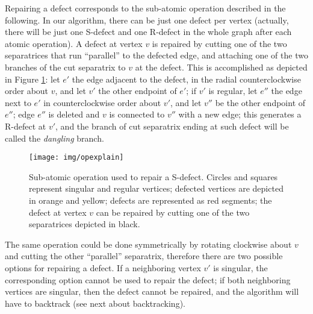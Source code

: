 \documentclass[11pt,a4paper]{article}
\begin{document}
Repairing a defect corresponds to the sub-atomic operation described in the following. 
In our algorithm, there can be just one defect per vertex (actually, there will be just one S-defect and one R-defect in the whole graph after each atomic operation). 
A defect at vertex $v$ is repaired by cutting one of the two separatrices that run ``parallel'' to the defected edge, and attaching one of the two branches of the cut separatrix to $v$ at the defect.
This is accomplished as depicted in Figure \ref{fig:repair}: let $e'$ the edge adjacent to the defect, in the radial counterclockwise order about $v$, and let $v'$ the other endpoint of $e'$; if $v'$ is regular, let $e''$ the edge next to $e'$ in counterclockwise order about $v'$, and let $v''$ be the other endpoint of $e''$; edge $e''$ is deleted and $v$ is connected to $v''$ with a new edge; this generates a R-defect at $v'$, and the branch of cut separatrix ending at such defect will be called the \emph{dangling} branch.

\begin{figure}
\centering
\mbox{}
\hfill
\centerline{\texttt{[image: img/opexplain]}}


\hfill\mbox{}
\caption{\label{fig:repair} Sub-atomic operation used to repair a S-defect. Circles and squares represent singular and regular vertices; defected vertices are depicted in orange and yellow; defects are represented as red segments; the defect at vertex $v$ can be repaired by cutting one of the two separatrices depicted in black.
}
\end{figure}


The same operation could be done symmetrically by rotating clockwise about $v$ and cutting the other ``parallel'' separatrix, therefore there are two possible options for repairing a defect. 
If a neighboring vertex $v'$ is singular, the corresponding option cannot be used to repair the defect; 
if both neighboring vertices are singular, then the defect cannot be repaired, and the algorithm will have to backtrack (see next about backtracking).
\end{document}
